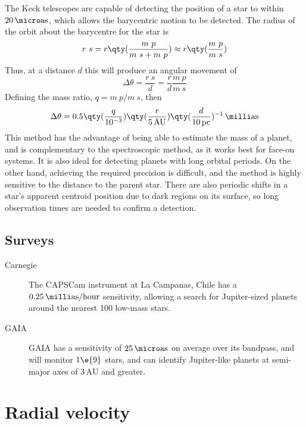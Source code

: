 The Keck telescopes are capable of detecting the position of a star to
within $20\,\micro\text{as}$, which allows the barycentric motion to
be detected. The radius of the orbit about the barycentre for the star is
\begin{equation}
  \label{eq:26}
  r~s = r \qty( \frac{m~p}{m~s + m~p} ) \approx r \qty( \frac{m~p}{m~s})
\end{equation}
Thus, at a distance $d$ this will produce an angular movement of 
\begin{equation}
  \label{eq:27}
  \Delta \theta = \frac{r~s}{d} = \frac{r}{d} \frac{m~p}{m~s}
\end{equation}
Defining the mass ratio, $q = m~p/m~s$, then
\begin{equation}
  \label{eq:28}
  \Delta \theta = 0.5 \qty( \frac{q}{10^{-3}}) \qty( \frac{r}{5\,\text{AU}} ) \qty( \frac{d}{10\,\text{pc}})^{-1} \,\milli\text{as}
\end{equation}
This method has the advantage of being able to estimate the mass of a
planet, and is complementary to the spectroscopic method, as it works
best for face-on systems. It is also ideal for detecting planets with
long orbital periods. On the other hand, achieving the required
precision is difficult, and the method is highly sensitive to the
distance to the parent star. There are also periodic shifts in a
star's apparent centroid position due to dark regions on its surface,
so long observation times are needed to confirm a detection.

\subsection{Surveys}
\label{sec:surveys-2}

\begin{description}
\item[Carnegie] The CAPSCam instrument at La Campanas, Chile has a
  $0.25\,\milli\text{as}/\text{hour}$ sensitivity, allowing a search
  for Jupiter-sized planets around the nearest 100 low-mass stars.
\item[GAIA] GAIA has a sensitivity of $25\,\micro\text{as}$ on average
  over its bandpass, and will monitor $1\e{9}$ stars, and can identify
  Jupiter-like planets at semi-major axes of $3\,\text{AU}$ and
  greater.
\end{description}

\section{Radial velocity}
\label{sec:radial-velocity}


